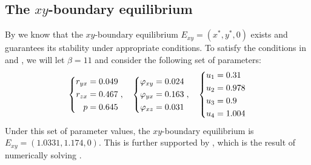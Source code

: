 \subsection{The $xy$-boundary equilibrium}\label{subsec:numsim_xy_boundary_equilibrium}
By  we know that the $xy$-boundary equilibrium $E_{xy}=\left(x^*,y^*,0\right)$ exists and  guarantees its stability under appropriate conditions. To satisfy the conditions in  and , we will let $\beta=11$ and consider the following set of parameters:
\begin{equation}\label{params:boundary-xy}
    \begin{dcases}
        \begin{aligned}
            r_{yx} &= 0.049\\
            r_{zx} &= 0.467\\
            p &= 0.645
        \end{aligned}
    \end{dcases},\quad 
    \begin{dcases}
        \begin{aligned}
            \varphi_{xy} &= 0.024\\
            \varphi_{yx} &= 0.163\\
            \varphi_{xz} &= 0.031
        \end{aligned}
    \end{dcases},\quad
    \begin{dcases}
        \begin{aligned}
            u_1 &= 0.31\\
            u_2 &= 0.978\\
            u_3 &= 0.9\\
            u_4 &= 1.004
        \end{aligned}
    \end{dcases}
\end{equation}
Under this set of parameter values, the $xy$-boundary equilibrium is $E_{xy}=(1.0331,1.174,0)$. This is further supported by , which is the result of numerically solving .

